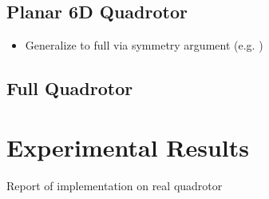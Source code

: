 \documentclass[conference]{IEEEtran}
\begin{document}
\subsection{Planar 6D Quadrotor}

\begin{itemize}
  \item Generalize to full via symmetry argument (e.g. \cite{Maidens2018})
\end{itemize}

\subsection{Full Quadrotor}


\section{Experimental Results}

Report of implementation on real quadrotor

\printbibliography 
\end{document}
